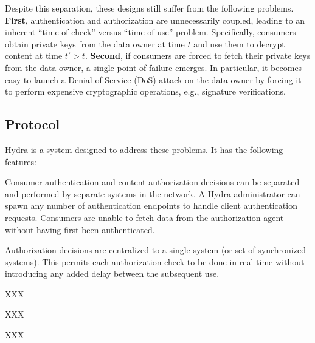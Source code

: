 \documentclass[conference]{IEEEtran}
\begin{document}
Despite this separation, these designs still suffer from the following problems.
{\bf First}, authentication and authorization are unnecessarily coupled, leading
to an inherent ``time of check'' versus ``time of use'' problem. Specifically,
consumers obtain private keys from the data owner at time $t$ and use them to
decrypt content at time $t' > t$. {\bf Second}, if consumers are forced to fetch
their private keys from the data owner, a single point of failure emerges. In
particular, it becomes easy to launch a Denial of Service (DoS) attack on the
data owner by forcing it to perform expensive cryptographic operations, e.g.,
signature verifications.

\subsection{Protocol}

Hydra is a system designed to address these problems. It has the following features:
%
\begin{compactitem}
    \item Consumer authentication and content authorization decisions can be separated
    and performed by separate systems in the network. A Hydra administrator can spawn
    any number of authentication endpoints to handle client authentication requests.
    Consumers are unable to fetch data from the authorization agent without having
    first been authenticated.
    \item Authorization decisions are centralized to a single system (or set of synchronized
    systems). This permits each authorization check to be done in real-time without
    introducing any added delay between the subsequent use.
    \item XXX
    \item XXX
    \item XXX
\end{compactitem}
%
\end{document}
